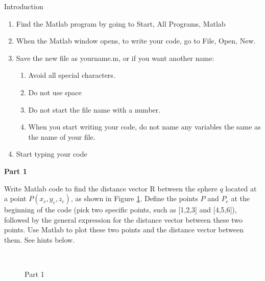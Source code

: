 \documentclass[]{report}
\begin{document}
\begin{description}

\item{Introduction}

\begin{enumerate}
\item Find the Matlab program by going to Start, All Programs, Matlab
\item When the Matlab window opens, to write your code,  go to File, Open, New. 
\item Save the new file as yourname.m, or if you want another name:
\begin{enumerate}
\item Avoid all special characters. 
\item Do not use space 
\item Do not start the file name with a number.
\item When you start writing your code, do not name any variables the same as the name of your file.
\end{enumerate} 
\item Start typing your code
\end{enumerate}

\item{\bf{Part 1}} 

Write Matlab code to find the distance vector R between the sphere $q$ located at a point $P(x_c,y_c,z_c)$, as shown in Figure \ref{f1}.  Define the points $P$ and $P_e$ at the beginning of the code (pick two specific points, such as [1,2,3] and [4,5,6]), followed by the general expression for the distance vector between these two points. Use Matlab to plot these two points and the distance vector between them.  See hints below.

\begin{figure}[htbp]
\begin{center}
\strut{} \\
\end{center}
\caption{Part 1}
\label{f1}
\end{figure}


\end{description}
\end{document}
